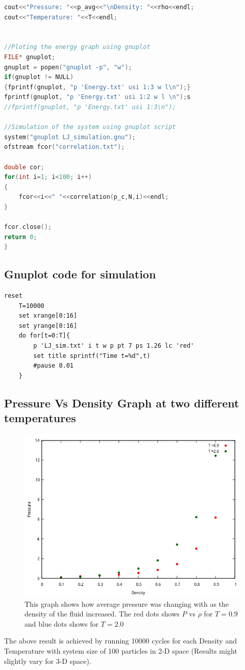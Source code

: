 \documentclass[]{report}
\begin{document}
\begin{lstlisting}[language=C++,style=mstyle]
cout<<"Pressure: "<<p_avg<<"\nDensity: "<<rho<<endl;
cout<<"Temperature: "<<T<<endl;
	
	
//Ploting the energy graph using gnuplot 
FILE* gnuplot;
gnuplot = popen("gnuplot -p", "w");
if(gnuplot != NULL)
{fprintf(gnuplot, "p 'Energy.txt' usi 1:3 w l\n");}
fprintf(gnuplot, "p 'Energy.txt' usi 1:2 w l \n");s
//fprintf(gnuplot, "p 'Energy.txt' usi 1:3\n");

//Simulation of the system using gnuplot script
system("gnuplot LJ_simulation.gnu");
ofstream fcor("correlation.txt");
		
double cor;
for(int i=1; i<100; i++)
{
	fcor<<i<<" "<<correlation(p_c,N,i)<<endl;
}
		
fcor.close();
return 0;
}
\end{lstlisting}

\subsection*{Gnuplot code for simulation}
\begin{lstlisting}[language=Gnuplot,style=mstyle]
	reset
	T=10000
	set xrange[0:16]
	set yrange[0:16]
	do for[t=0:T]{
		p 'LJ_sim.txt' i t w p pt 7 ps 1.26 lc 'red'
		set title sprintf("Time t=%d",t)
		#pause 0.01
	}
\end{lstlisting}

\newpage
\subsection*{Pressure Vs Density Graph at two different temperatures}
\begin{figure}[h] 
	\centering 
	\includegraphics[scale=0.8]{Pressure vs Density graph}
	\caption{ This graph shows how average pressure was changing with as the density of the fluid increased. The red dots shows $P$ vs $\rho$ for $T=0.9$ and blue dots shows for $T=2.0$}
		
\end{figure}
The above result is achieved by running 10000 cycles for each Density and Temperature with system size of 100 particles in 2-D space (Results might slightly vary for 3-D space).
\end{document}
